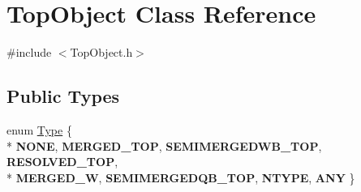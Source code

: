\hypertarget{classTopObject}{\section{Top\-Object Class Reference}
\label{classTopObject}
}


{\ttfamily \#include $<$Top\-Object.\-h$>$}

\subsection*{Public Types}
\begin{DoxyCompactItemize}
\item 
enum \hyperlink{classTopObject_af82a20e421c29bc667af7cd73fc46ba4}{Type} \{ \\*
{\bfseries N\-O\-N\-E}, 
{\bfseries M\-E\-R\-G\-E\-D\-\_\-\-T\-O\-P}, 
{\bfseries S\-E\-M\-I\-M\-E\-R\-G\-E\-D\-W\-B\-\_\-\-T\-O\-P}, 
{\bfseries R\-E\-S\-O\-L\-V\-E\-D\-\_\-\-T\-O\-P}, 
\\*
{\bfseries M\-E\-R\-G\-E\-D\-\_\-\-W}, 
{\bfseries S\-E\-M\-I\-M\-E\-R\-G\-E\-D\-Q\-B\-\_\-\-T\-O\-P}, 
{\bfseries N\-T\-Y\-P\-E}, 
{\bfseries A\-N\-Y}
 \}
\end{DoxyCompactItemize}
